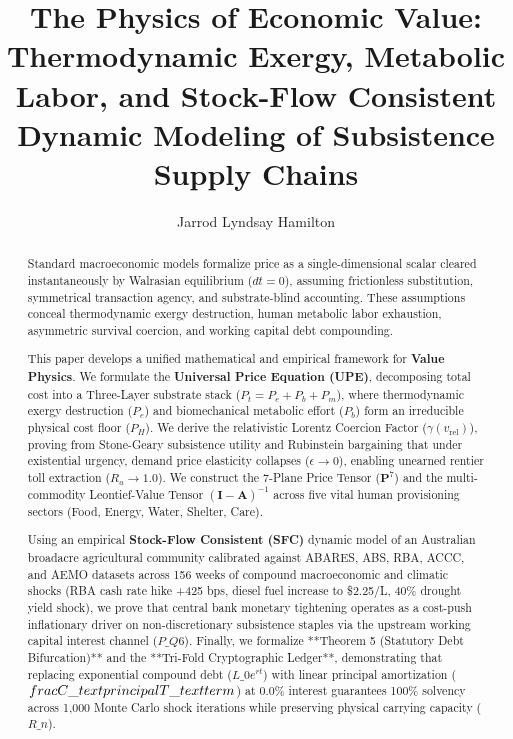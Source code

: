 \documentclass[preprint,12pt,authoryear]{elsarticle}
\theoremstyle{definition}
\begin{document}
\begin{frontmatter}

\title{The Physics of Economic Value: Thermodynamic Exergy, Metabolic Labor, and Stock-Flow Consistent Dynamic Modeling of Subsistence Supply Chains}

\author{Jarrod Lyndsay Hamilton}
\address{Alethekanon Research Institute, Australia}

\begin{abstract}
Standard macroeconomic models formalize price as a single-dimensional scalar cleared instantaneously by Walrasian equilibrium ($dt = 0$), assuming frictionless substitution, symmetrical transaction agency, and substrate-blind accounting. These assumptions conceal thermodynamic exergy destruction, human metabolic labor exhaustion, asymmetric survival coercion, and working capital debt compounding.

  

This paper develops a unified mathematical and empirical framework for \textbf{Value Physics}. We formulate the \textbf{Universal Price Equation (UPE)}, decomposing total cost into a Three-Layer substrate stack ($P_t = P_e + P_b + P_m$), where thermodynamic exergy destruction ($P_e$) and biomechanical metabolic effort ($P_b$) form an irreducible physical cost floor ($P_H$). We derive the relativistic Lorentz Coercion Factor ($\gamma(v_{\text{rel}})$), proving from Stone-Geary subsistence utility and Rubinstein bargaining that under existential urgency, demand price elasticity collapses ($\epsilon \to 0$), enabling unearned rentier toll extraction ($R_a \to 1.0$). We construct the 7-Plane Price Tensor ($\mathbf{P}^7$) and the multi-commodity Leontief-Value Tensor $(\mathbf{I} - \mathbf{A})^{-1}$ across five vital human provisioning sectors (Food, Energy, Water, Shelter, Care).

  

Using an empirical \textbf{Stock-Flow Consistent (SFC)} dynamic model of an Australian broadacre agricultural community calibrated against ABARES, ABS, RBA, ACCC, and AEMO datasets across 156 weeks of compound macroeconomic and climatic shocks (RBA cash rate hike +425 bps, diesel fuel increase to \$2.25/L, 40\% drought yield shock), we prove that central bank monetary tightening operates as a cost-push inflationary driver on non-discretionary subsistence staples via the upstream working capital interest channel ($P\_{Q6}$). Finally, we formalize **Theorem 5 (Statutory Debt Bifurcation)** and the **Tri-Fold Cryptographic Ledger**, demonstrating that replacing exponential compound debt ($L\_0 e^{rt}$) with linear principal amortization ($\\frac{C\_{\\text{principal}}}{T\_{\\text{term}}}$) at 0.0\% interest guarantees 100\% solvency across 1,000 Monte Carlo shock iterations while preserving physical carrying capacity ($R\_n$).
\end{abstract}


\end{frontmatter}
\end{document}
